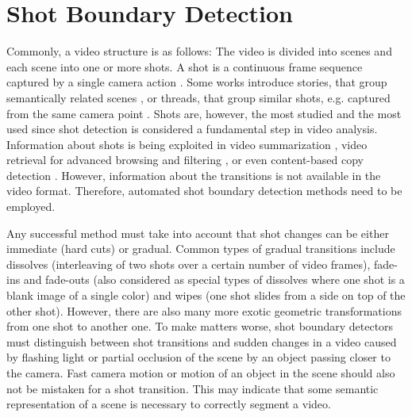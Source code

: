 \chapter{Shot Boundary Detection}

Commonly, a video structure is as follows: The video is divided into scenes and each scene into one or more shots. A shot is a continuous frame sequence captured by a single camera action \cite{FormalStudyofSBD}. Some works introduce stories, that group semantically related scenes \cite{MethodsandChallengesinSBD}, or threads, that group similar shots, e.g. captured from the same camera point \cite{LearningContextualThreadModelSceneSegmentation}. Shots are, however, the most studied and the most used since shot detection is considered a fundamental step in video analysis. Information about shots is being exploited in video summarization \cite{Zhao_2018_CVPR}, video retrieval for advanced browsing and filtering \cite{LokocVBSJournal2018}, or even content-based copy detection \cite{Fuzzycolorhistogram}. However, information about the transitions is not available in the video format. Therefore, automated shot boundary detection methods need to be employed.

Any successful method must take into account that shot changes can be either immediate (hard cuts) or gradual. Common types of gradual transitions include dissolves (interleaving of two shots over a certain number of video frames), fade-ins and fade-outs (also considered as special types of dissolves where one shot is a blank image of a single color) and wipes (one shot slides from a side on top of the other shot). However, there are also many more exotic geometric transformations from one shot to another one.
To make matters worse, shot boundary detectors must distinguish between shot transitions and sudden changes in a video caused by flashing light or partial occlusion of the scene by an object passing closer to the camera. Fast camera motion or motion of an object in the scene should also not be mistaken for a shot transition. This may indicate that some semantic representation of a scene is necessary to correctly segment a video.

